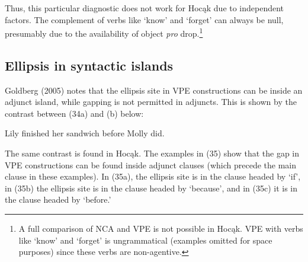 \documentclass[output=paper]{LSP/langsci}
\begin{document}
Thus, this particular diagnostic does not work for Hoc\k{a}k due to independent factors. The complement of verbs like `know' and `forget' can always be null, presumably due to the availability of object \emph{pro} drop.\footnote{A full comparison of NCA and VPE is not possible in Hoc\k{a}k. VPE with verbs like `know' and `forget' is ungrammatical (examples omitted for space purposes) since these verbs are non-agentive.}

\subsection{Ellipsis in syntactic islands}

Goldberg (2005) notes that the ellipsis site in VPE constructions can be inside an adjunct island, while gapping is not permitted in adjuncts. This is shown by the contrast between (34a) and (b) below:

\begin{exe}
\ex
\begin{xlist}
\ex
Lily finished her sandwich before Molly did.
\end{xlist}
\end{exe}

The same contrast is found in Hoc\k{a}k. The examples in (35) show that the gap in VPE constructions can be found inside adjunct clauses (which precede the main clause in these examples). In (35a), the ellipsis site is in the clause headed by `if', in (35b) the ellipsis site is in the clause headed by `because', and in (35c) it is in the clause headed by `before.'
\end{document}
